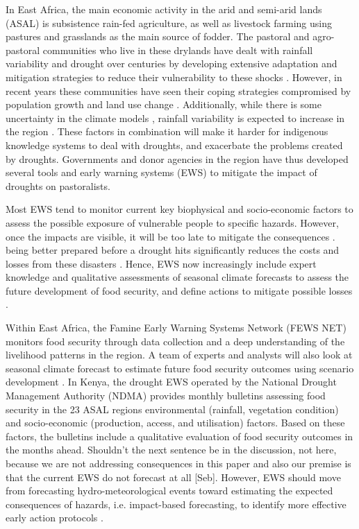 \documentclass[review]{elsarticle}
\begin{document}
In East Africa, the main economic activity in the arid and semi-arid lands (ASAL) is subsistence rain-fed agriculture, as well as livestock farming using pastures and grasslands as the main source of fodder. The pastoral and agro-pastoral communities who live in these drylands have dealt with rainfall variability and drought over centuries by developing extensive adaptation and mitigation strategies to reduce their vulnerability to these shocks \citep{Nyong2007,orindi2007pastoral}. However, in recent years these communities have seen their coping strategies compromised by population growth and land use change \citep{Galvin2001ImpactsOC}. Additionally, while there is some uncertainty in the climate models \citep[IPCC,][]{stocker2013climate}, rainfall variability is expected to increase in the region \citep{Tierneye1500682,yang2018brief}. These factors in combination will make it harder for indigenous knowledge systems to deal with droughts, and exacerbate the problems created by droughts.  Governments and donor agencies in the region have thus developed several tools and early warning systems (EWS) to mitigate the impact of droughts on pastoralists.


Most EWS tend to monitor current key biophysical and socio-economic factors to assess the possible exposure of vulnerable people to specific hazards. However, once the impacts are visible, it will be too late to mitigate the consequences \citep{kogan}.  being better prepared before a drought hits significantly reduces the costs and losses from these disasters \citep{venton2012economics}. Hence, EWS now increasingly include expert knowledge and qualitative assessments of seasonal climate forecasts to assess the future development of food security, and define actions to mitigate possible losses \citep{nhess-15-895-2015,TozierdelaPoterie2015}. 

Within East Africa, the Famine Early Warning Systems Network (FEWS NET) monitors food security through data collection and a deep understanding of the livelihood patterns in the region. A team of experts and analysts will also look at seasonal climate forecast to estimate future food security outcomes using scenario development \citep{FEWS}. In Kenya, the drought EWS operated by the National Drought Management Authority (NDMA) provides monthly bulletins assessing food security in the 23 ASAL regions   environmental (rainfall, vegetation condition) and socio-economic (production, access, and utilisation) factors. Based on these factors, the bulletins include a qualitative evaluation of food security outcomes in the months ahead. {\color{red} Shouldn't the next sentence be in the discussion, not here, because we are not addressing consequences in this paper and also our premise is that the current EWS do not forecast at all [Seb]}. However, EWS should move from forecasting hydro-meteorological events toward estimating the expected consequences of hazards, i.e. impact-based forecasting, to identify more effective early action protocols \citep{wmo2015wmo,nhess-2018-26}.
\end{document}
